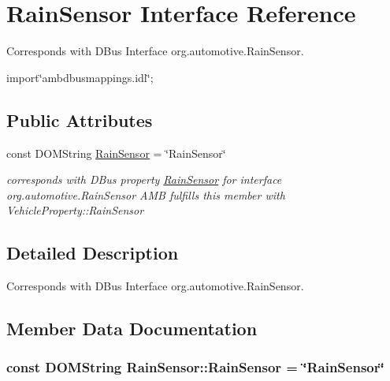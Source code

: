 \hypertarget{interfaceRainSensor}{\section{Rain\+Sensor Interface Reference}
\label{interfaceRainSensor}
}


Corresponds with D\+Bus Interface org.\+automotive.\+Rain\+Sensor.  




{\ttfamily import\char`\"{}ambdbusmappings.\+idl\char`\"{};}

\subsection*{Public Attributes}
\begin{DoxyCompactItemize}
\item 
const D\+O\+M\+String \hyperlink{interfaceRainSensor_a4668873f067758b3e28719e815cda204}{Rain\+Sensor} = \char`\"{}Rain\+Sensor\char`\"{}
\begin{DoxyCompactList}\small\item\em corresponds with D\+Bus property \hyperlink{interfaceRainSensor}{Rain\+Sensor} for interface org.\+automotive.\+Rain\+Sensor A\+M\+B fulfills this member with Vehicle\+Property\+::\+Rain\+Sensor \end{DoxyCompactList}\end{DoxyCompactItemize}


\subsection{Detailed Description}
Corresponds with D\+Bus Interface org.\+automotive.\+Rain\+Sensor. 

\subsection{Member Data Documentation}
\hypertarget{interfaceRainSensor_a4668873f067758b3e28719e815cda204}{
\subsubsection[{Rain\+Sensor}]{\setlength{\rightskip}{0pt plus 5cm}const D\+O\+M\+String Rain\+Sensor\+::\+Rain\+Sensor = \char`\"{}Rain\+Sensor\char`\"{}}}\label{interfaceRainSensor_a4668873f067758b3e28719e815cda204}


